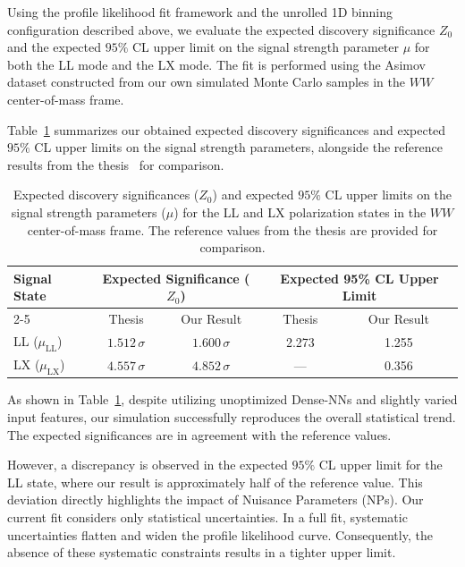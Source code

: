 \documentclass[12pt]{article}
\begin{document}
        Using the profile likelihood fit framework and the unrolled 1D binning configuration described above, we evaluate the expected discovery significance $Z_0$ and the expected $95\%$ CL upper limit on the signal strength parameter $\mu$ for both the LL mode and the LX mode. The fit is performed using the Asimov dataset constructed from our own simulated Monte Carlo samples in the $WW$ center-of-mass frame.

        Table~\ref{tab:our_expected_significance} summarizes our obtained expected discovery significances and expected $95\%$ CL upper limits on the signal strength parameters, alongside the reference results from the thesis~\cite{stange2025longitudinal} for comparison.

        \begin{table}[htpb]
            \centering
            \caption{Expected discovery significances ($Z_0$) and expected $95\%$ CL upper limits on the signal strength parameters ($\mu$) for the LL and LX polarization states in the $WW$ center-of-mass frame. The reference values from the thesis are provided for comparison.}
            \label{tab:our_expected_significance}
            \begin{tabular}{lcccc}
                \hline
                \hline
                \multirow{2}{*}{Signal State} & \multicolumn{2}{c}{Expected Significance ($Z_0$)} & \multicolumn{2}{c}{Expected 95\% CL Upper Limit} \\
                \cline{2-5}
                               & Thesis & Our Result & Thesis & Our Result \\
                \hline
                LL ($\mu_{\text{LL}}$)  & $1.512\,\sigma$ & $1.600\,\sigma$ & 2.273 & 1.255 \\
                LX ($\mu_{\text{LX}}$)  & $4.557\,\sigma$ & $4.852\,\sigma$ & --- & 0.356 \\
                \hline
                \hline
            \end{tabular}
        \end{table}

        As shown in Table~\ref{tab:our_expected_significance}, despite utilizing unoptimized Dense-NNs and slightly varied input features, our simulation successfully reproduces the overall statistical trend. The expected significances are in agreement with the reference values.

        However, a discrepancy is observed in the expected $95\%$ CL upper limit for the LL state, where our result is approximately half of the reference value. This deviation directly highlights the impact of Nuisance Parameters (NPs). Our current fit considers only statistical uncertainties. In a full fit, systematic uncertainties flatten and widen the profile likelihood curve. Consequently, the absence of these systematic constraints results in a tighter upper limit. 
\end{document}
